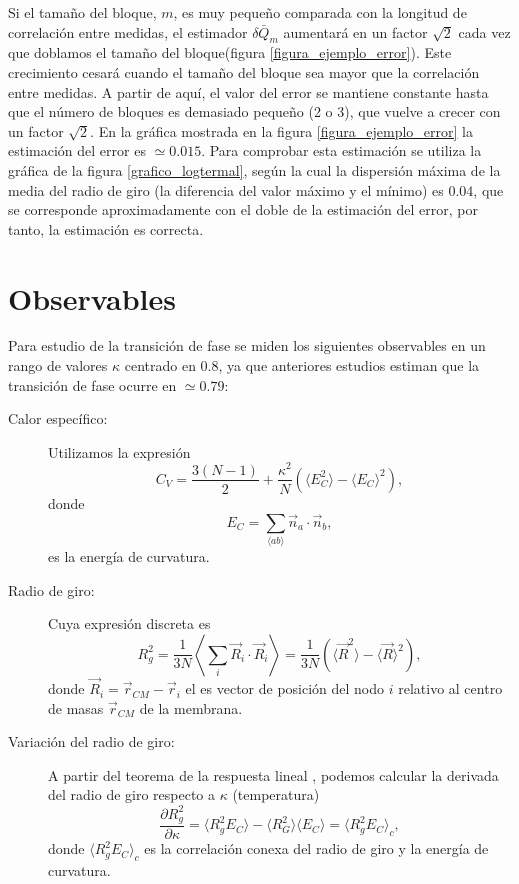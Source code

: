 Si el tamaño del bloque, $m$, es muy pequeño comparada con la longitud de
correlación entre medidas, el estimador $\delta\bar{Q}_m$ aumentará en un
factor $\sqrt{2}$ cada vez que doblamos el tamaño del bloque(figura
\ref{figura_ejemplo_error}). Este crecimiento cesará cuando el tamaño del
bloque sea mayor que la correlación entre medidas. A partir de aquí, el valor
del error se mantiene constante hasta que el número de bloques es demasiado
pequeño (2 o 3), que vuelve a crecer con un factor $\sqrt{2}$. En la gráfica
mostrada en la figura \ref{figura_ejemplo_error} la estimación del error es
$\simeq 0.015$. Para comprobar esta estimación se utiliza la gráfica de la
figura \ref{grafico_logtermal}, según la cual la
dispersión máxima de la media del radio de giro (la diferencia del valor máximo y el
mínimo) es $0.04$, que se corresponde aproximadamente con el doble de la
estimación del error, por tanto, la estimación es correcta.

\section{Observables}

Para estudio de la transición de fase se miden los siguientes observables en
un rango de valores $\kappa$ centrado en $0.8$, ya que anteriores estudios \cite{Bowick_flat_phase}
estiman que la transición de fase ocurre en $\simeq 0.79$:
\begin{description}
\item[Calor específico:] Utilizamos la expresión \cite{Harnish:CV}
\begin{equation}\label{CV_discreto}
 C_V=\frac{3(N-1)}{2}+\frac{\kappa^2}{N}(\langle E_C^2 \rangle-\langle E_C
\rangle^2),
\end{equation}
donde
\begin{equation}
E_C=\sum_{\langle ab \rangle}\vec{n}_a\cdot\vec{n}_b, 
\end{equation}
es la energía de curvatura.
\item[Radio de giro:] Cuya expresión discreta es 
\begin{equation} R_g^{2}=\frac{1}{3N}\left\langle \sum_{i}
  \vec{R}_i\cdot\vec{R}_i\right\rangle=\frac{1}{3N}(\langle\vec{R}^2 \rangle
-\langle\vec{R} \rangle^2),
\end{equation}
donde $\vec{R}_i=\vec{r}_{CM}-\vec{r}_i $ el es vector de posición del nodo
$i$ relativo al centro de masas $\vec{r}_{CM}$ de la membrana.

\item[Variación del radio de giro:] A partir del teorema de la respuesta
  lineal \cite{Binney:critical_phenomema}, podemos calcular la derivada del
  radio de giro respecto a $\kappa$ (temperatura) 
\begin{equation}
  \frac{\partial R_g^2}{\partial \kappa}=\langle R_g^2 E_C \rangle-\langle R_G^2\rangle\langle E_C\rangle=\langle R_g^2E_C \rangle_c,
\end{equation}
donde $\langle R_g^2E_C \rangle_c$ es la correlación conexa del radio de giro
y la energía de curvatura.
\end{description}

